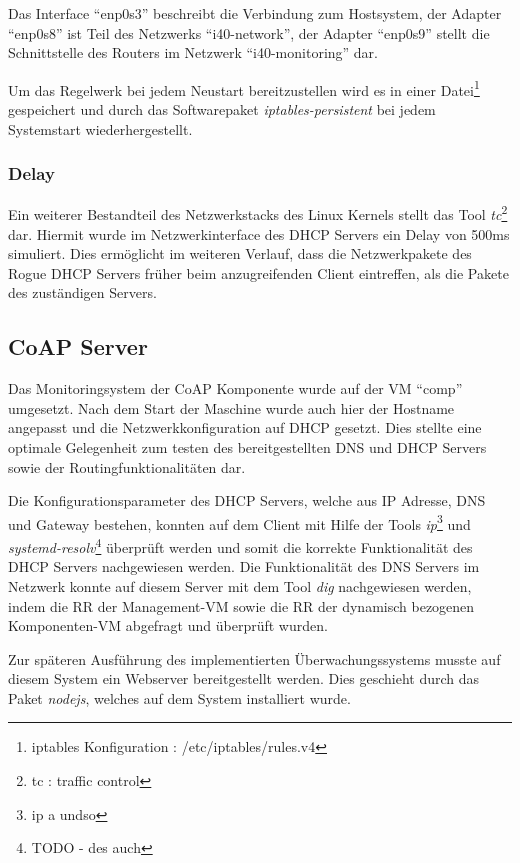

Das Interface "`enp0s3"' beschreibt die Verbindung zum Hostsystem, der Adapter "`enp0s8"' ist Teil des Netzwerks "`i40-network"', der Adapter "`enp0s9"' stellt die Schnittstelle des Routers im Netzwerk "`i40-monitoring"' dar. 

Um das Regelwerk bei jedem Neustart bereitzustellen wird es in einer Datei\footnote{iptables Konfiguration : /etc/iptables/rules.v4} gespeichert und durch das Softwarepaket \textit{iptables-persistent} bei jedem Systemstart wiederhergestellt.

\subsubsection{Delay}
Ein weiterer Bestandteil des Netzwerkstacks des Linux Kernels stellt das Tool \textit{tc}\footnote{tc : traffic control} dar. Hiermit wurde im Netzwerkinterface des \ac{DHCP} Servers ein Delay von 500ms simuliert. Dies ermöglicht im weiteren Verlauf, dass die Netzwerkpakete des Rogue \ac{DHCP} Servers früher beim anzugreifenden Client eintreffen, als die Pakete des zuständigen Servers.

\subsection{\ac{CoAP} Server}
Das Monitoringsystem der \ac{CoAP} Komponente wurde auf der \ac{VM} "`comp"' umgesetzt. Nach dem Start der Maschine wurde auch hier der Hostname angepasst und die Netzwerkkonfiguration auf \ac{DHCP} gesetzt. Dies stellte eine optimale Gelegenheit zum testen des bereitgestellten \ac{DNS} und \ac{DHCP} Servers sowie der Routingfunktionalitäten dar.

Die Konfigurationsparameter des \ac{DHCP} Servers, welche aus \ac{IP} Adresse, \ac{DNS} und Gateway bestehen, konnten auf dem Client mit Hilfe der Tools \textit{ip}\footnote{ip a undso} und \textit{systemd-resolv}\footnote{TODO - des auch} überprüft werden und somit die korrekte Funktionalität des \ac{DHCP} Servers nachgewiesen werden. Die Funktionalität des \ac{DNS} Servers im Netzwerk konnte auf diesem Server mit dem Tool \textit{dig} nachgewiesen werden, indem die \ac{RR} der Management-\ac{VM} sowie die \ac{RR} der dynamisch bezogenen Komponenten-\ac{VM} abgefragt und überprüft wurden.

Zur späteren Ausführung des implementierten Überwachungssystems musste auf diesem System ein Webserver bereitgestellt werden. Dies geschieht durch das Paket \textit{nodejs}, welches auf dem System installiert wurde.

